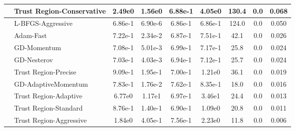 \documentclass[10pt]{article}
\begin{document}
\begin{longtable}{|l|l|c|c|c|c|c|c|c|}
\hline
 & Trust Region-Conservative & 2.49e0 & 1.56e0 & 6.88e-1 & 4.05e0 & 130.4 & 0.0 & 0.068 \\
\hline
 & L-BFGS-Aggressive & 6.86e-1 & 6.90e-6 & 6.86e-1 & 6.86e-1 & 124.0 & 0.0 & 0.050 \\
\hline
 & Adam-Fast & 7.22e-1 & 2.34e-2 & 6.87e-1 & 7.51e-1 & 42.1 & 0.0 & 0.026 \\
\hline
 & GD-Momentum & 7.08e-1 & 5.01e-3 & 6.99e-1 & 7.17e-1 & 25.8 & 0.0 & 0.024 \\
\hline
 & GD-Nesterov & 7.03e-1 & 4.03e-3 & 6.94e-1 & 7.12e-1 & 25.7 & 0.0 & 0.024 \\
\hline
 & Trust Region-Precise & 9.09e-1 & 1.95e-1 & 7.00e-1 & 1.21e0 & 36.1 & 0.0 & 0.019 \\
\hline
 & GD-AdaptiveMomentum & 7.83e-1 & 1.76e-2 & 7.62e-1 & 8.35e-1 & 18.0 & 0.0 & 0.016 \\
\hline
 & Trust Region-Adaptive & 6.77e0 & 1.17e1 & 6.97e-1 & 3.46e1 & 24.4 & 0.0 & 0.013 \\
\hline
 & Trust Region-Standard & 8.76e-1 & 1.40e-1 & 6.90e-1 & 1.09e0 & 20.8 & 0.0 & 0.011 \\
\hline
 & Trust Region-Aggressive & 1.84e0 & 4.05e-1 & 7.56e-1 & 2.23e0 & 11.8 & 0.0 & 0.006 \\
\end{longtable}
\end{document}

